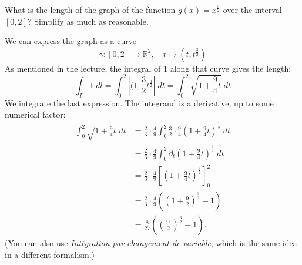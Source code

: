 \documentclass[11pt]{article}
\begin{document}
\begin{exercise}
    What is the length of the graph of the function $g(x) = x^{\frac 3 2}$ over the interval $[0,2]$?
    Simplify as much as reasonable.
\end{exercise}
\begin{solution}
    We can express the graph as a curve 
    \[
        \gamma : [0,2] \to \mathbb R^2, \quad t \mapsto ( t, t^{\frac 3 2} ) 
    \]
    As mentioned in the lecture, the integral of $1$ along that curve gives the length:
    \[
        \int_\Gamma 1 \;dl = \int_0^2 \left| ( 1, \frac 3 2 t^{\frac 1 2} \right| \;dt = \int_0^2 \sqrt{ 1 + \frac 9 4 t } \;dt
    \]
    We integrate the last expression. The integrand is a derivative, up to some numerical factor:
    \begin{align*}
        \int_0^2 \sqrt{ 1 + \frac 9 4 t } \;dt 
        &= 
        \frac 2 3 \cdot \frac 4 9 \int_0^2 \frac 3 2 \cdot \frac 9 4 \left( 1 + \frac 9 4 t \right)^{\frac 1 2} \;dt 
        \\&= 
        \frac 2 3 \cdot \frac 4 9 \int_0^2 \partial_t \left( 1 + \frac 9 4 t \right)^{\frac 3 2} \;dt 
        \\&= 
        \frac 2 3 \cdot \frac 4 9 \left[ \left( 1 + \frac 9 4 t \right)^{\frac 3 2} \right]_0^2
        \\&= 
        \frac 2 3 \cdot \frac 4 9 \left( \left( 1 + \frac 9 2 \right)^{\frac 3 2} - 1 \right)
        \\&= 
        \frac{8}{27} \left( \left( \frac {11} 2 \right)^{\frac 3 2} - 1 \right)
        .
    \end{align*}
    (You can also use \textit{Intégration par changement de variable}, which is the same idea in a different formalism.)
\end{solution}
\end{document}
